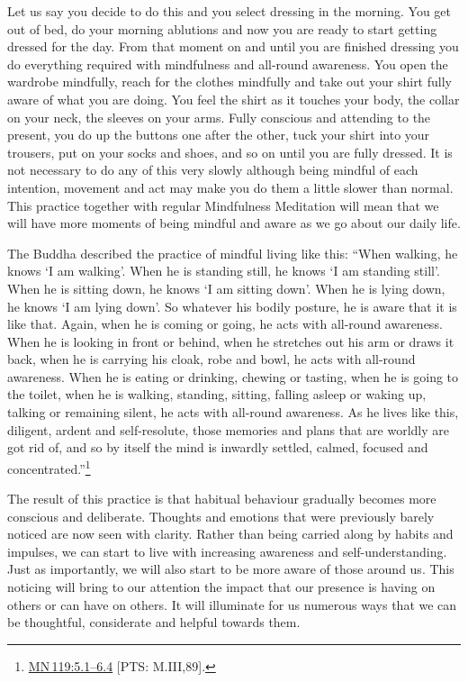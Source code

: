 \documentclass[10pt, openright]{book}
\begin{document}
Let us say you decide to do this and you select dressing in the morning. You get out of bed, do your morning ablutions and now you are ready to start getting dressed for the day. From that moment on and until you are finished dressing you do everything required with mindfulness and all-round awareness. You open the wardrobe mindfully, reach for the clothes mindfully and take out your shirt fully aware of what you are doing. You feel the shirt as it touches your body, the collar on your neck, the sleeves on your arms. Fully conscious and attending to the present, you do up the buttons one after the other, tuck your shirt into your trousers, put on your socks and shoes, and so on until you are fully dressed. It is not necessary to do any of this very slowly although being mindful of each intention, movement and act may make you do them a little slower than normal. This practice together with regular Mindfulness Meditation will mean that we will have more moments of being mindful and aware as we go about our daily life.


The Buddha described the practice of mindful living like this: “When walking, he knows ‘I am walking’. When he is standing still, he knows ‘I am standing still’. When he is sitting down, he knows ‘I am sitting down’. When he is lying down, he knows ‘I am lying down’. So whatever his bodily posture, he is aware that it is like that. Again, when he is coming or going, he acts with all-round awareness. When he is looking in front or behind, when he stretches out his arm or draws it back, when he is carrying his cloak, robe and bowl, he acts with all-round awareness. When he is eating or drinking, chewing or tasting, when he is going to the toilet, when he is walking, standing, sitting, falling asleep or waking up, talking or remaining silent, he acts with all-round awareness. As he lives like this, diligent, ardent and self-resolute, those memories and plans that are worldly are got rid of, and so by itself the mind is inwardly settled, calmed, focused and concentrated.”\footnote {\href{https://suttacentral.net/mn119/en/sujato\#5.1}{MN 119:5.1–6.4} [PTS: M.III,89].}


The result of this practice is that habitual behaviour gradually becomes more conscious and deliberate. Thoughts and emotions that were previously barely noticed are now seen with clarity. Rather than being carried along by habits and impulses, we can start to live with increasing awareness and self-understanding. Just as importantly, we will also start to be more aware of those around us. This noticing will bring to our attention the impact that our presence is having on others or can have on others. It will illuminate for us numerous ways that we can be thoughtful, considerate and helpful towards them.
\end{document}
